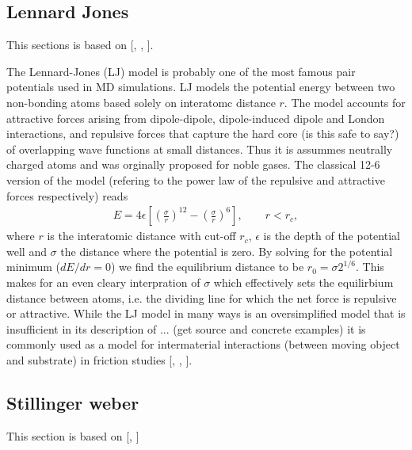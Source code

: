 \subsection{Lennard Jones}
This sections is based on [\cite{docs_lammps_LJ}, \cite{C9CP05445F}, \cite{chem_libretexts_LJ}].

The Lennard-Jones (LJ) model is probably one of the most famous pair potentials used in MD simulations. LJ models the potential energy between two non-bonding atoms based solely on interatomc distance $r$. The model accounts for attractive forces arising from dipole-dipole, dipole-induced dipole and London interactions, and repulsive forces that capture the hard core (is this safe to say?) of overlapping wave functions at small distances. Thus it is assummes neutrally charged atoms and was orginally proposed for noble gases. The classical 12-6 version of the model (refering to the power law of the repulsive and attractive forces respectively) reads
\begin{align}
  E = 4\epsilon \left[\left(\frac{\sigma}{r}\right)^{12} - \left(\frac{\sigma}{r}\right)^6 \right ], \qquad r < r_c,
  \label{eq:LJ}
\end{align}
where $r$ is the interatomic distance with cut-off $r_c$, $\epsilon$ is the depth of the potential well and $\sigma$ the distance where the potential is zero. By solving for the potential minimum ($dE/dr = 0$) we find the equilibrium distance to be $r_0 = \sigma 2^{1/6}$. This makes for an even cleary interpration of $\sigma$ which effectively sets the equilirbium distance between atoms, i.e. the dividing line for which the net force is repulsive or attractive. While the LJ model in many ways is an oversimplified model that is insufficient in its description of ... (get source and concrete examples) it is commonly used as a model for intermaterial interactions (between moving object and substrate) in friction studies [\cite{li_evolving_2016}, \cite{ZHANG201585}, \cite{kim_nano-scale_2009}].


\subsection{Stillinger weber}
This section is based on [\cite{docs_lammps_sw}, \cite{PhysRevB.31.5262}]

